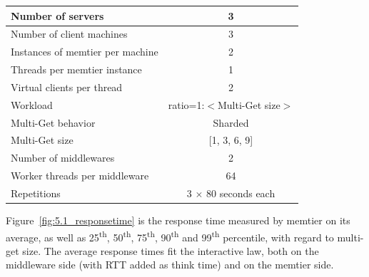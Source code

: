 \begin{center}
	\scriptsize{
		\begin{tabular}{|l|c|}
			\hline Number of servers                & 3                       \\ 
			\hline Number of client machines        & 3                       \\ 
			\hline Instances of memtier per machine & 2                       \\ 
			\hline Threads per memtier instance     & 1                       \\
			\hline Virtual clients per thread       & 2     		            \\ 
			\hline Workload                         & ratio=1:$<$Multi-Get size$>$             \\
			\hline Multi-Get behavior               & Sharded                 \\
			\hline Multi-Get size                   & [1, 3, 6, 9]                  \\
			\hline Number of middlewares            & 2                       \\
			\hline Worker threads per middleware    & 64 \\
			\hline Repetitions                      & 3 $\times$ 80 seconds each     \\ 
			\hline 
		\end{tabular}
	} 
\end{center}

Figure~\ref{fig:5.1_responsetime} is the response time measured by memtier on its average, as well as 25\textsuperscript{th}, 50\textsuperscript{th}, 75\textsuperscript{th}, 90\textsuperscript{th} and 99\textsuperscript{th} percentile, with regard to multi-get size. The average response times fit the interactive law, both on the middleware side (with RTT added as think time) and on the memtier side.

